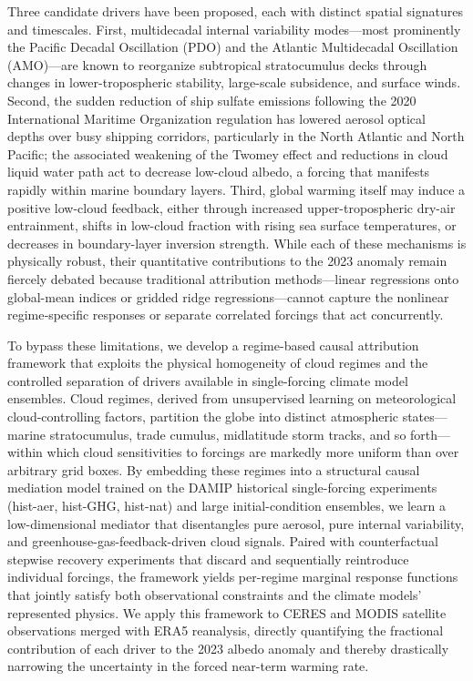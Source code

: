 \documentclass{article}
\begin{document}
Three candidate drivers have been proposed, each with distinct spatial signatures and timescales. First, multidecadal internal variability modes—most prominently the Pacific Decadal Oscillation (PDO) and the Atlantic Multidecadal Oscillation (AMO)—are known to reorganize subtropical stratocumulus decks through changes in lower-tropospheric stability, large-scale subsidence, and surface winds. Second, the sudden reduction of ship sulfate emissions following the 2020 International Maritime Organization regulation has lowered aerosol optical depths over busy shipping corridors, particularly in the North Atlantic and North Pacific; the associated weakening of the Twomey effect and reductions in cloud liquid water path act to decrease low-cloud albedo, a forcing that manifests rapidly within marine boundary layers. Third, global warming itself may induce a positive low-cloud feedback, either through increased upper-tropospheric dry-air entrainment, shifts in low-cloud fraction with rising sea surface temperatures, or decreases in boundary-layer inversion strength. While each of these mechanisms is physically robust, their quantitative contributions to the 2023 anomaly remain fiercely debated because traditional attribution methods—linear regressions onto global-mean indices or gridded ridge regressions—cannot capture the nonlinear regime‑specific responses or separate correlated forcings that act concurrently.

To bypass these limitations, we develop a regime-based causal attribution framework that exploits the physical homogeneity of cloud regimes and the controlled separation of drivers available in single-forcing climate model ensembles. Cloud regimes, derived from unsupervised learning on meteorological cloud-controlling factors, partition the globe into distinct atmospheric states—marine stratocumulus, trade cumulus, midlatitude storm tracks, and so forth—within which cloud sensitivities to forcings are markedly more uniform than over arbitrary grid boxes. By embedding these regimes into a structural causal mediation model trained on the DAMIP historical single-forcing experiments (hist-aer, hist-GHG, hist-nat) and large initial-condition ensembles, we learn a low-dimensional mediator that disentangles pure aerosol, pure internal variability, and greenhouse-gas-feedback-driven cloud signals. Paired with counterfactual stepwise recovery experiments that discard and sequentially reintroduce individual forcings, the framework yields per-regime marginal response functions that jointly satisfy both observational constraints and the climate models’ represented physics. We apply this framework to CERES and MODIS satellite observations merged with ERA5 reanalysis, directly quantifying the fractional contribution of each driver to the 2023 albedo anomaly and thereby drastically narrowing the uncertainty in the forced near-term warming rate.
\end{document}
